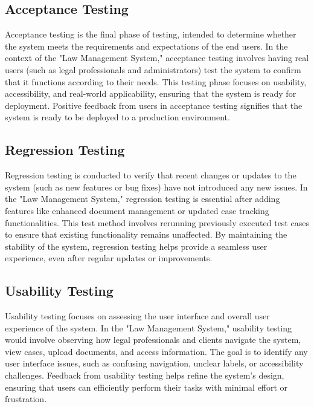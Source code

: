 \subsection{Acceptance Testing}

Acceptance testing is the final phase of testing, intended to determine whether the system meets the requirements and expectations of the end users. In the context of the "Law Management System," acceptance testing involves having real users (such as legal professionals and administrators) test the system to confirm that it functions according to their needs. This testing phase focuses on usability, accessibility, and real-world applicability, ensuring that the system is ready for deployment. Positive feedback from users in acceptance testing signifies that the system is ready to be deployed to a production environment.

\subsection{Regression Testing}

Regression testing is conducted to verify that recent changes or updates to the system (such as new features or bug fixes) have not introduced any new issues. In the "Law Management System," regression testing is essential after adding features like enhanced document management or updated case tracking functionalities. This test method involves rerunning previously executed test cases to ensure that existing functionality remains unaffected. By maintaining the stability of the system, regression testing helps provide a seamless user experience, even after regular updates or improvements.

\subsection{Usability Testing}

Usability testing focuses on assessing the user interface and overall user experience of the system. In the "Law Management System," usability testing would involve observing how legal professionals and clients navigate the system, view cases, upload documents, and access information. The goal is to identify any user interface issues, such as confusing navigation, unclear labels, or accessibility challenges. Feedback from usability testing helps refine the system’s design, ensuring that users can efficiently perform their tasks with minimal effort or frustration.
